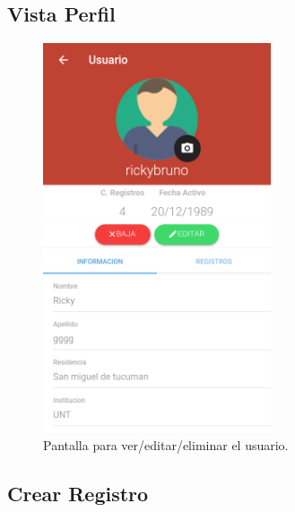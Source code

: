 \begin{itemize}
				\subsection{Vista Perfil}
					\begin{figure}
						\centering
							\includegraphics[width=0.6\textwidth]{Screenshots/perfil.png}
									\caption{Pantalla para ver/editar/eliminar el usuario.}
							\label{fig:perfil}
					\end{figure}

				\subsection{Crear Registro}


\end{itemize}
